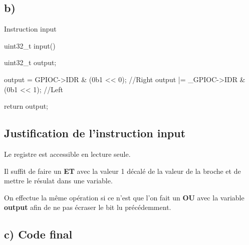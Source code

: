 \documentclass[12pt]{report}
\renewcommand{\bold}[1]{\textbf{#1}}
\begin{document}
\subsection{b)}

\begin{Cpp}{Instruction input}

uint32_t input() {

    uint32_t output;

    output = GPIOC->IDR & (0b1 << 0);  //Right
    output |= _GPIOC->IDR & (0b1 << 1); //Left
    
    return output;
}

\end{Cpp}

\subsection{Justification de l'instruction input}

Le registre  est accessible en lecture seule.

Il suffit de faire un \bold{ET} avec la valeur 1 décalé de la valeur de la broche et de mettre le résulat dans une variable.

On effectue la même opération si ce n'est que l'on fait un \bold{OU} avec la variable \bold{output} afin de ne pas écraser le bit lu précédemment.


\subsection{c) Code final}
\end{document}
